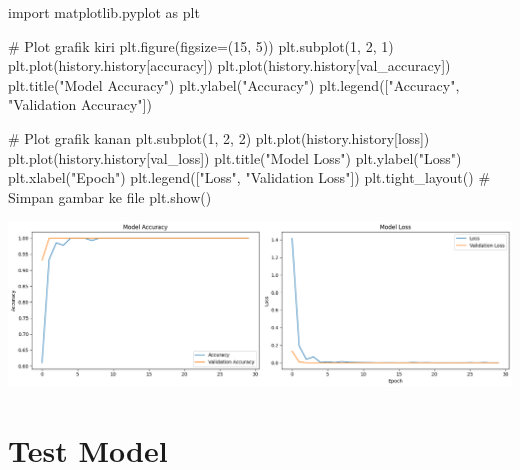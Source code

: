 \documentclass[
  letterpaper,
  DIV=11,
  numbers=noendperiod]{scrreprt}
\newenvironment{Shaded}{\begin{snugshade}}{\end{snugshade}}
\newcommand{\CommentTok}[1]{\textcolor[rgb]{0.37,0.37,0.37}{#1}}
\newcommand{\DecValTok}[1]{\textcolor[rgb]{0.68,0.00,0.00}{#1}}
\newcommand{\ImportTok}[1]{\textcolor[rgb]{0.00,0.46,0.62}{#1}}
\newcommand{\NormalTok}[1]{\textcolor[rgb]{0.00,0.23,0.31}{#1}}
\newcommand{\OperatorTok}[1]{\textcolor[rgb]{0.37,0.37,0.37}{#1}}
\newcommand{\StringTok}[1]{\textcolor[rgb]{0.13,0.47,0.30}{#1}}
\begin{document}
\begin{Shaded}
\begin{Highlighting}[]
\ImportTok{import}\NormalTok{ matplotlib.pyplot }\ImportTok{as}\NormalTok{ plt}

\CommentTok{\# Plot grafik kiri}
\NormalTok{plt.figure(figsize}\OperatorTok{=}\NormalTok{(}\DecValTok{15}\NormalTok{, }\DecValTok{5}\NormalTok{))}
\NormalTok{plt.subplot(}\DecValTok{1}\NormalTok{, }\DecValTok{2}\NormalTok{, }\DecValTok{1}\NormalTok{)}
\NormalTok{plt.plot(history.history[}\StringTok{\textquotesingle{}accuracy\textquotesingle{}}\NormalTok{])}
\NormalTok{plt.plot(history.history[}\StringTok{\textquotesingle{}val\_accuracy\textquotesingle{}}\NormalTok{])}
\NormalTok{plt.title(}\StringTok{"Model Accuracy"}\NormalTok{)}
\NormalTok{plt.ylabel(}\StringTok{"Accuracy"}\NormalTok{)}
\NormalTok{plt.legend([}\StringTok{"Accuracy"}\NormalTok{, }\StringTok{"Validation Accuracy"}\NormalTok{])}

\CommentTok{\# Plot grafik kanan}
\NormalTok{plt.subplot(}\DecValTok{1}\NormalTok{, }\DecValTok{2}\NormalTok{, }\DecValTok{2}\NormalTok{)}
\NormalTok{plt.plot(history.history[}\StringTok{\textquotesingle{}loss\textquotesingle{}}\NormalTok{])}
\NormalTok{plt.plot(history.history[}\StringTok{\textquotesingle{}val\_loss\textquotesingle{}}\NormalTok{])}
\NormalTok{plt.title(}\StringTok{"Model Loss"}\NormalTok{)}
\NormalTok{plt.ylabel(}\StringTok{"Loss"}\NormalTok{)}
\NormalTok{plt.xlabel(}\StringTok{"Epoch"}\NormalTok{)}
\NormalTok{plt.legend([}\StringTok{"Loss"}\NormalTok{, }\StringTok{"Validation Loss"}\NormalTok{])}
\NormalTok{plt.tight\_layout()}
\CommentTok{\# Simpan gambar ke file}
\NormalTok{plt.show()}
\end{Highlighting}
\end{Shaded}

\includegraphics{Asset/plot_transferlearning.png}

\hypertarget{test-model-2}{%
\section*{Test Model}\label{test-model-2}}
\end{document}
